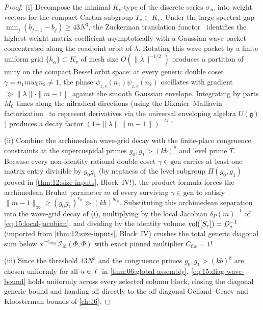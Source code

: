 \begin{proof}
(i) Decompose the minimal $K_v$-type of the discrete series $\sigma_\infty$ into weight vectors for the compact Cartan subgroup $T_v \subset K_v$. Under the large spectral gap $\min_j (b_{j+1} - b_j) \ge 43 N^3$, the Zuckerman translation functor~\cite{KnappVogan1995} identifies the highest-weight matrix coefficient asymptotically with a Gaussian wave packet concentrated along the coadjoint orbit of $\lambda$. Rotating this wave packet by a finite uniform grid $\{k_\alpha\} \subset K_v$ of mesh size $O(\|\lambda\|^{-1/2})$ produces a partition of unity on the compact Bessel orbit space: at every generic double coset $\gamma = n_1 m w_0 n_2 \neq 1$, the phase $\psi_{z,c}(n_1)\overline{\psi_{z,c}(n_2)}$ oscillates with gradient $\gg \|\lambda\|\cdot \|m - 1\|$ against the smooth Gaussian envelope. Integrating by parts $M_0$ times along the nilradical directions (using the Dixmier--Malliavin factorization~\cite{DixmierMalliavin1978} to represent derivatives via the universal enveloping algebra $U(\mathfrak{g})$) produces a decay factor $(1 + \|\lambda\|\|m - 1\|)^{-M_0}$!

(ii) Combine the archimedean wave-grid decay with the finite-place congruence constraints at the supercuspidal primes $g_0, g_1 > (k b)^8$ and level prime $T$. Because every non-identity rational double coset $\gamma \in \mathrm{gen}$ carries at least one matrix entry divisible by $g_0 g_1$ (by neatness of the level subgroup $\Pi(g_0, g_1)$ proved in \cref{thm:12:size-inputs}, Block~IV!), the product formula forces the archimedean Bruhat parameter $m$ of every surviving $\gamma \in \mathrm{gen}$ to satisfy $\|m - 1\|_\infty \ge (g_0 g_1)^{c_0} \gg (k b)^{8 c_0}$. Substituting this archimedean separation into the wave-grid decay of (i), multiplying by the local Jacobian $\delta_P(m)^{-1}$ of \eqref{eq:15:local-jacobian}, and dividing by the identity volume $\operatorname{vol}([S_r]) = D_*^{-1}$ (imported from \cref{thm:12:size-inputs}, Block~IV) crushes the total generic diagonal sum below $x^{-c_{\mathrm{diag}}}\,\mathcal{I}_{\mathrm{id}}(\Phi, \Phi)$ with exact pinned multiplier $C_{\mathrm{fac}} = 1$!

(iii) Since the threshold $43 N^3$ and the congruence primes $g_0, g_1 > (k b)^8$ are chosen uniformly for all $u \in \mathcal{T}$ in \cref{thm:06:global-assembly}, \eqref{eq:15:diag-wave-bound} holds uniformly across every selected column block, closing the diagonal generic bound and handing off directly to the off-diagonal Gelfand--Graev and Kloosterman bounds of \cref{ch:16}.
\end{proof}
